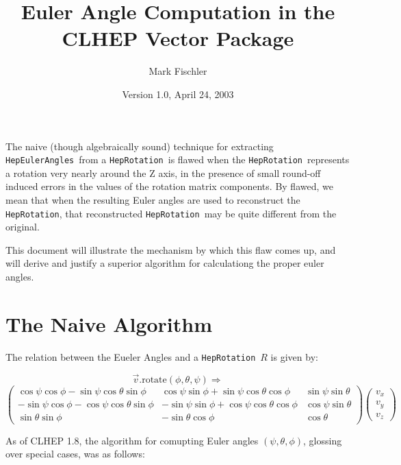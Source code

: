 \documentclass[twoside,12pt]{article}
\def \Ro {{\tt HepRotation}}
\def \Es {{\tt HepEulerAngles}}
\begin{document}
\title{Euler Angle Computation in the CLHEP {\bf Vector} Package}

\author{Mark Fischler}
\date{Version 1.0, April 24, 2003}
\maketitle

The naive (though algebraically sound) technique for extracting \Es\ 
from a \Ro\ is flawed when the \Ro\ represents a rotation very nearly 
around the Z axis, in the presence of small round-off induced errors 
in the values of the rotation matrix components.
By flawed, we mean that when the resulting Euler angles are used to 
reconstruct the \Ro, that reconstructed \Ro\ may be quite different 
from the original.

This document will illustrate the mechanism by which this flaw comes up,
and will derive and justify a superior algorithm for calculationg the proper
euler angles.

\tableofcontents

\section{The Naive Algorithm}

The relation between the Eueler Angles and a \Ro\ $R$ is given by:

\[  \vec{v}.\mbox{rotate}(\phi, \theta, \psi) \Longrightarrow  \]
\begin{equation}
\label{eq:eulerrot}
\left(
\begin{array}{ccc}
\cos \psi \cos \phi - \sin \psi \cos \theta \sin \phi &
\cos \psi \sin \phi + \sin \psi \cos \theta \cos \phi &
\sin \psi \sin \theta \\
- \sin \psi \cos \phi - \cos \psi \cos \theta \sin \phi &
- \sin \psi \sin \phi + \cos \psi \cos \theta \cos \phi &
\cos \psi \sin \theta \\
\sin \theta \sin \phi &
- \sin \theta \cos \phi &
\cos \theta
\end{array}
\right)
\left(
\begin{array}{c}
v_x\\
v_y\\
v_z
\end{array}
\right)
\end{equation}


As of CLHEP 1.8, the algorithm for comupting Euler angles 
$(\psi, \theta, \phi)$,
glossing over special cases, was as follows:
\end{document}
